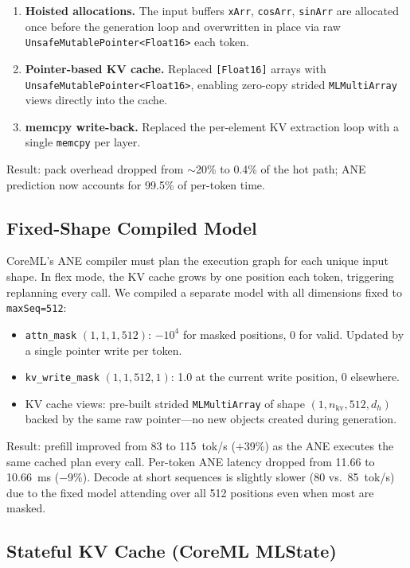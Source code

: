 \documentclass[11pt,twocolumn]{article}
\begin{document}
\begin{enumerate}
\item \textbf{Hoisted allocations.} The input buffers \texttt{xArr},
  \texttt{cosArr}, \texttt{sinArr} are allocated once before the
  generation loop and overwritten in place via raw
  \texttt{UnsafeMutablePointer<Float16>} each token.
\item \textbf{Pointer-based KV cache.} Replaced \texttt{[Float16]}
  arrays with \texttt{UnsafeMutablePointer<Float16>}, enabling zero-copy
  strided \texttt{MLMultiArray} views directly into the cache.
\item \textbf{memcpy write-back.} Replaced the per-element KV
  extraction loop with a single \texttt{memcpy} per layer.
\end{enumerate}

Result: pack overhead dropped from $\sim$20\% to 0.4\% of the hot
path; ANE prediction now accounts for 99.5\% of per-token time.

\subsection{Fixed-Shape Compiled Model}

CoreML's ANE compiler must plan the execution graph for each unique
input shape.  In flex mode, the KV cache grows by one position each
token, triggering replanning every call.  We compiled a separate model
with all dimensions fixed to \texttt{maxSeq=512}:

\begin{itemize}
\item \texttt{attn\_mask} $(1, 1, 1, 512)$: $-10^4$ for masked
  positions, 0 for valid.  Updated by a single pointer write per
  token.
\item \texttt{kv\_write\_mask} $(1, 1, 512, 1)$: 1.0 at the current
  write position, 0 elsewhere.
\item KV cache views: pre-built strided \texttt{MLMultiArray} of shape
  $(1, n_\text{kv}, 512, d_h)$ backed by the same raw pointer---no
  new objects created during generation.
\end{itemize}

Result: prefill improved from 83 to 115~tok/s ($+$39\%) as the ANE
executes the same cached plan every call.  Per-token ANE latency
dropped from 11.66 to 10.66~ms ($-$9\%).  Decode at short sequences is
slightly slower (80 vs.\ 85~tok/s) due to the fixed model attending
over all 512 positions even when most are masked.

\subsection{Stateful KV Cache (CoreML MLState)}
\end{document}
